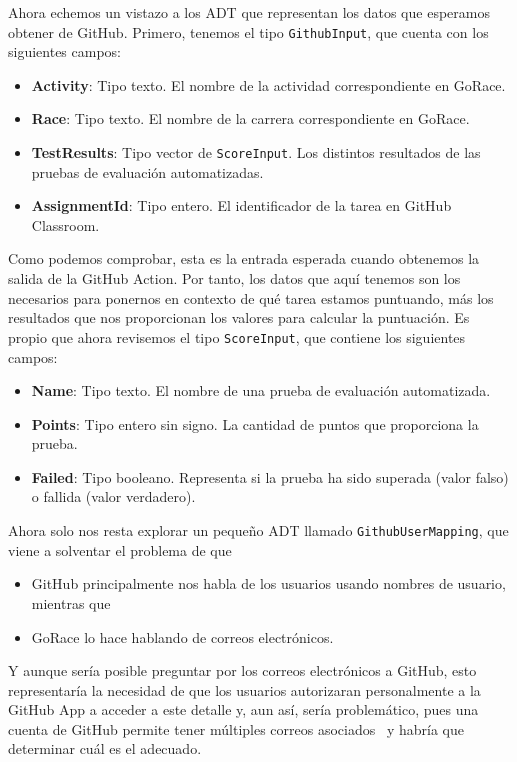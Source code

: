Ahora echemos un vistazo a los \acrshort{ADT} que representan los datos que esperamos obtener de GitHub. Primero, tenemos el tipo {\tt GithubInput}, que cuenta con los siguientes campos:
\begin{itemize}
    \item \textbf{Activity}: Tipo texto. El nombre de la actividad correspondiente en GoRace.
	\item \textbf{Race}: Tipo texto. El nombre de la carrera correspondiente en GoRace.
	\item \textbf{TestResults}: Tipo vector de {\tt ScoreInput}. Los distintos resultados de las pruebas de evaluación automatizadas.
	\item \textbf{AssignmentId}: Tipo entero. El identificador de la tarea en GitHub Classroom.
\end{itemize}
Como podemos comprobar, esta es la entrada esperada cuando obtenemos la salida de la GitHub Action. Por tanto, los datos que aquí tenemos son los necesarios para ponernos en contexto de qué tarea estamos puntuando, más los resultados que nos proporcionan los valores para calcular la puntuación. Es propio que ahora revisemos el tipo {\tt ScoreInput}, que contiene los siguientes campos:
\begin{itemize}
    \item \textbf{Name}: Tipo texto. El nombre de una prueba de evaluación automatizada.
	\item \textbf{Points}: Tipo entero sin signo. La cantidad de puntos que proporciona la prueba.
	\item \textbf{Failed}: Tipo booleano. Representa si la prueba ha sido superada (valor falso) o fallida (valor verdadero).
\end{itemize}

Ahora solo nos resta explorar un pequeño \acrshort{ADT} llamado {\tt GithubUserMapping}, que viene a solventar el problema de que 
\begin{itemize} 
\item
GitHub principalmente nos habla de los usuarios usando nombres de usuario, mientras que 
\item 
GoRace lo hace hablando de correos electrónicos. 
\end{itemize}
Y aunque sería posible preguntar por los correos electrónicos a GitHub, esto representaría la necesidad de que los usuarios autorizaran personalmente a la GitHub App a acceder a este detalle y, aun así, sería problemático, pues una cuenta de GitHub permite tener múltiples correos asociados~\cite{githubRESTEmail} y habría que determinar cuál es el adecuado. 

